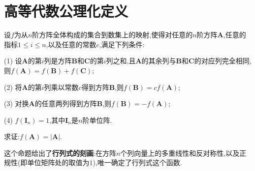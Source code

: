 \documentclass[../../main.tex]{subfiles}
\begin{document}
\section{高等代数公理化定义}

\begin{theorem}[行列式的刻画]\label{theorem:行列式的刻画}
设$f$为从$n$阶方阵全体构成的集合到数集上的映射,使得对任意的$n$阶方阵$\boldsymbol{A}$,任意的指标$1\leqslant  i\leqslant  n$,以及任意的常数$c$,满足下列条件:

(1) 设$\boldsymbol{A}$的第$i$列是方阵$\boldsymbol{B}$和$\boldsymbol{C}$的第$i$列之和,且$\boldsymbol{A}$的其余列与$\boldsymbol{B}$和$\boldsymbol{C}$的对应列完全相同,则$f(\boldsymbol{A})=f(\boldsymbol{B})+f(\boldsymbol{C})$;

(2) 将$\boldsymbol{A}$的第$i$列乘以常数$c$得到方阵$\boldsymbol{B}$,则$f(\boldsymbol{B})=cf(\boldsymbol{A})$;

(3) 对换$\boldsymbol{A}$的任意两列得到方阵$\boldsymbol{B}$,则$f(\boldsymbol{B})= - f(\boldsymbol{A})$;

(4) $f(\boldsymbol{I}_n)=1$,其中$\boldsymbol{I}_n$是$n$阶单位阵.

求证:$f(\boldsymbol{A})=\vert \boldsymbol{A}\vert$.
\end{theorem}
\begin{note}
这个命题给出了\textbf{行列式的刻画}:在方阵\(n\)个列向量上的多重线性和反对称性,以及正规性(即单位矩阵处的取值为\(1\)),唯一确定了行列式这个函数.
\end{note}
\end{document}
